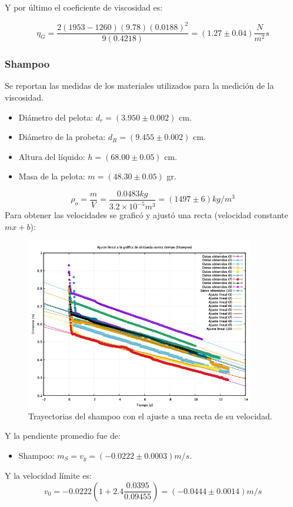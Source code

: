 \documentclass[a4paper]{article}
\begin{document}
Y por último el coeficiente de viscosidad es:

\begin{equation}
    \eta_G = \frac{2(1953-1260)(9.78)(0.0188)^2}{9(0.4218)} = (1.27 \pm 0.04) \frac{N}{m^2}s
\end{equation}

\subsubsection*{Shampoo}
Se reportan las medidas de los materiales utilizados para la medición de la viscosidad.
\begin{itemize}
    \item Diámetro del pelota: $d_r = (3.950\pm0.002)$ cm.
    \item Diámetro de la probeta: $d_R = (9.455\pm0.002)$ cm.
    \item Altura del líquido: $h = (68.00 \pm 0.05)$ cm.
    \item Masa de la pelota: $m = (48.30\pm0.05)$ gr.
\end{itemize}
\begin{equation}
    \rho_o = \frac{m}{V} = \frac{0.0483 kg}{3.2\times10^{-5} m^3} = (1497\pm6) kg/m^3
\end{equation}
Para obtener las velocidades se graficó y ajustó una recta (velocidad constante $mx+b$):
\begin{figure}[H]
    \centering
    \includegraphics[width=10cm]{shampoo.png}
    \caption{Trayectorias del shampoo con el ajuste a una recta de su velocidad.}
\end{figure}
Y la pendiente promedio fue de:
\begin{itemize}
    \item Shampoo: $ m_S = v_y = (-0.0222\pm0.0003) m/s$.
\end{itemize}
Y la velocidad límite es:
\begin{equation}
    v_0 = -0.0222 \left(1+ 2.4\frac{0.0395}{0.09455} \right) = (-0.0444\pm0.0014) m/s
\end{equation}
\end{document}
